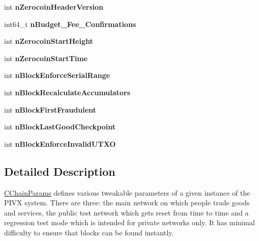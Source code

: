\begin{DoxyCompactItemize}
\mbox{\label{class_c_chain_params_acc2851a966d3668c09bfdbea7bb5de96}} 
int {\bfseries n\+Zerocoin\+Header\+Version}
\item 
\mbox{\label{class_c_chain_params_a1bc99b0b408a74f8946a220c5feb5b0c}} 
int64\+\_\+t {\bfseries n\+Budget\+\_\+\+Fee\+\_\+\+Confirmations}
\item 
\mbox{\label{class_c_chain_params_aca752e6cd13e695d2f679fed05ce15a6}} 
int {\bfseries n\+Zerocoin\+Start\+Height}
\item 
\mbox{\label{class_c_chain_params_a1ece3e405b68957ccc0b8269d4f1c99f}} 
int {\bfseries n\+Zerocoin\+Start\+Time}
\item 
\mbox{\label{class_c_chain_params_a52246ab367decc6365b4ca07f1502a9e}} 
int {\bfseries n\+Block\+Enforce\+Serial\+Range}
\item 
\mbox{\label{class_c_chain_params_a0f1c3b37309c7df072a82aaa94010fe3}} 
int {\bfseries n\+Block\+Recalculate\+Accumulators}
\item 
\mbox{\label{class_c_chain_params_afa3d076eba27a08e2163e4763d91e02f}} 
int {\bfseries n\+Block\+First\+Fraudulent}
\item 
\mbox{\label{class_c_chain_params_a054fbf57da6d3f8f042093b07e79b13d}} 
int {\bfseries n\+Block\+Last\+Good\+Checkpoint}
\item 
\mbox{\label{class_c_chain_params_a728b558cdbea31d05d5c76ea55b0c40a}} 
int {\bfseries n\+Block\+Enforce\+Invalid\+U\+T\+XO}
\end{DoxyCompactItemize}


\subsection{Detailed Description}
\mbox{\hyperlink{class_c_chain_params}{C\+Chain\+Params}} defines various tweakable parameters of a given instance of the P\+I\+VX system. There are three\+: the main network on which people trade goods and services, the public test network which gets reset from time to time and a regression test mode which is intended for private networks only. It has minimal difficulty to ensure that blocks can be found instantly. 

